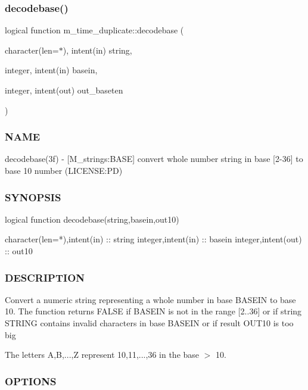 \subsubsection{\texorpdfstring{decodebase()}{decodebase()}}
{\footnotesize\ttfamily logical function m\+\_\+time\+\_\+duplicate\+::decodebase (\begin{DoxyParamCaption}\item[{character(len=$\ast$), intent(in)}]{string,  }\item[{integer, intent(in)}]{basein,  }\item[{integer, intent(out)}]{out\+\_\+baseten }\end{DoxyParamCaption})}



\subsubsection*{N\+A\+ME}

decodebase(3f) -\/ \mbox{[}M\+\_\+strings\+:B\+A\+SE\mbox{]} convert whole number string in base \mbox{[}2-\/36\mbox{]} to base 10 number (L\+I\+C\+E\+N\+SE\+:PD)

\subsubsection*{S\+Y\+N\+O\+P\+S\+IS}

\begin{DoxyVerb}logical function decodebase(string,basein,out10)

 character(len=*),intent(in)  :: string
 integer,intent(in)           :: basein
 integer,intent(out)          :: out10
\end{DoxyVerb}
 \subsubsection*{D\+E\+S\+C\+R\+I\+P\+T\+I\+ON}

Convert a numeric string representing a whole number in base B\+A\+S\+E\+IN to base 10. The function returns F\+A\+L\+SE if B\+A\+S\+E\+IN is not in the range \mbox{[}2..36\mbox{]} or if string S\+T\+R\+I\+NG contains invalid characters in base B\+A\+S\+E\+IN or if result O\+U\+T10 is too big

The letters A,B,...,Z represent 10,11,...,36 in the base $>$ 10.

\subsubsection*{O\+P\+T\+I\+O\+NS}

